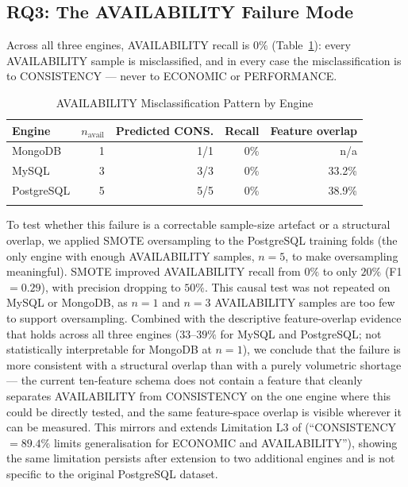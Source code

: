 \documentclass[pdflatex,sn-mathphys-num]{sn-jnl}
\theoremstyle{thmstyleone}
\theoremstyle{thmstylethree}
\begin{document}
\subsection{RQ3: The AVAILABILITY Failure Mode}\label{subsec:rq3}

Across all three engines, AVAILABILITY recall is $0\%$
(Table~\ref{tab:confusion-availability}): every AVAILABILITY sample is
misclassified, and in every case the misclassification is to
CONSISTENCY --- never to ECONOMIC or PERFORMANCE.

\begin{table}[h]
\caption{AVAILABILITY Misclassification Pattern by Engine}\label{tab:confusion-availability}
\begin{tabular}{@{}lrrrr@{}}
\toprule
Engine & $n_{\text{avail}}$ & Predicted CONS. & Recall & Feature overlap\footnotemark[2] \\
\midrule
MongoDB     & 1 & 1/1 & 0\% & n/a\footnotemark[3] \\
MySQL       & 3 & 3/3 & 0\% & 33.2\% \\
PostgreSQL  & 5 & 5/5 & 0\% & 38.9\% \\
\botrule
\end{tabular}
\end{table}

To test whether this failure is a correctable sample-size artefact or
a structural overlap, we applied SMOTE oversampling to the PostgreSQL
training folds (the only engine with enough AVAILABILITY samples,
$n=5$, to make oversampling meaningful). SMOTE improved AVAILABILITY
recall from $0\%$ to only $20\%$ (F1 $=0.29$), with precision dropping
to $50\%$. This causal test was not repeated on MySQL or MongoDB, as
$n=1$ and $n=3$ AVAILABILITY samples are too few to support
oversampling. Combined with the descriptive feature-overlap evidence
that holds across all three engines ($33$--$39\%$ for MySQL and
PostgreSQL; not statistically interpretable for MongoDB at $n=1$), we
conclude that the failure is more consistent with a structural
overlap than with a purely volumetric shortage --- the current
ten-feature schema does not contain a feature that cleanly separates
AVAILABILITY from CONSISTENCY on the one engine where this could be
directly tested, and the same feature-space overlap is visible
wherever it can be measured. This mirrors and extends Limitation L3 of
\cite{iaha2026}
(``CONSISTENCY $=89.4\%$ limits generalisation for ECONOMIC and
AVAILABILITY''), showing the same limitation persists after extension
to two additional engines and is not specific to the original
PostgreSQL dataset.
\end{document}
